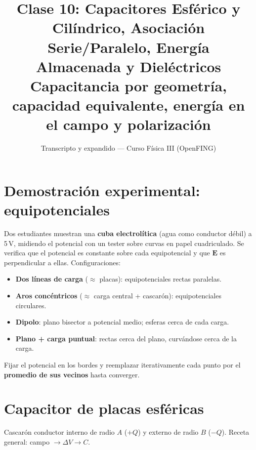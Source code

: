 \documentclass[12pt,a4paper]{article}
\title{\textbf{Clase 10: Capacitores Esférico y Cilíndrico, Asociación \\
        Serie/Paralelo, Energía Almacenada y Dieléctricos}\\[0.3em]
        \large{Capacitancia por geometría, capacidad equivalente,
              energía en el campo y polarización}}
\author{Transcripto y expandido --- Curso Física III (OpenFING)}
\date{}
\begin{document}
\maketitle
\thispagestyle{empty}
\newpage

\tableofcontents
\newpage

\section{Demostración experimental: equipotenciales}

Dos estudiantes muestran una \textbf{cuba electrolítica} (agua como
conductor débil) a 5\,V, midiendo el potencial con un tester sobre curvas
en papel cuadriculado. Se verifica que el potencial es constante sobre
cada equipotencial y que $\mathbf{E}$ es perpendicular a ellas.
Configuraciones:

\begin{itemize}[nosep]
  \item \textbf{Dos líneas de carga} ($\approx$ placas): equipotenciales
        rectas paralelas.
  \item \textbf{Aros concéntricos} ($\approx$ carga central + cascarón):
        equipotenciales circulares.
  \item \textbf{Dipolo}: plano bisector a potencial medio; esferas cerca
        de cada carga.
  \item \textbf{Plano + carga puntual}: rectas cerca del plano,
        curvándose cerca de la carga.
\end{itemize}

\begin{notebox}
  Fijar el potencial en los bordes y reemplazar iterativamente cada punto
  por el \textbf{promedio de sus vecinos} hasta converger.
\end{notebox}



\section{Capacitor de placas esféricas}

Cascarón conductor interno de radio $A$ ($+Q$) y externo de radio $B$
($-Q$). Receta general: campo $\to \Delta V \to C$.
\end{document}
